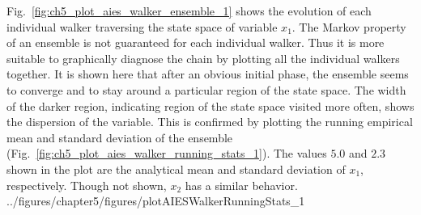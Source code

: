 Fig.~\ref{fig:ch5_plot_aies_walker_ensemble_1} shows the evolution of each individual walker traversing the state space of variable $x_1$.
The Markov property of an ensemble is not guaranteed for each individual walker.
Thus it is more suitable to graphically diagnose the chain by plotting all the individual walkers together.
It is shown here that after an obvious initial phase,
the ensemble seems to converge and to stay around a particular region of the state space.
The width of the darker region, indicating region of the state space visited more often,
shows the dispersion of the variable. 
This is confirmed by plotting the running empirical mean and standard deviation of the ensemble (Fig.~\ref{fig:ch5_plot_aies_walker_running_stats_1}).
The values $5.0$ and $2.3$ shown in the plot are the analytical mean and standard deviation of $x_1$, respectively.
Though not shown, $x_2$ has a similar behavior.
{../figures/chapter5/figures/plotAIESWalkerRunningStats_1}


